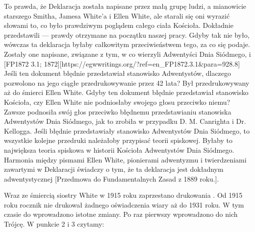 To prawda, że Deklaracja  została napisane przez małą grupę ludzi, a mianowicie starszego Smitha, Jamesa White'a i Ellen White, ale starali się oni wyrazić słowami to, co było prawdziwym poglądem całego ciała Kościoła. Dokładnie przedstawili  — prawdy otrzymane na początku naszej pracy. Gdyby tak nie było, wówczas ta deklaracja byłaby całkowitym przeciwieństwem tego, za co się podaje. Zostały one napisane,  związane z tym, w co wierzyli Adwentyści Dnia Siódmego,  i [FP1872 3.1; 1872][https://egwwritings.org/?ref=en\_FP1872.3.1&para=928.8] Jeśli ten dokument błędnie przedstawiał stanowisko Adwentystów, dlaczego pozwolono na jego ciągłe przedrukowywanie przez 42 lata? Był przedrukowywany aż do śmierci Ellen White. Gdyby ten dokument błędnie przedstawiał stanowisko Kościoła, czy Ellen White nie podniosłaby swojego głosu przeciwko niemu? Zawsze podnosiła swój głos przeciwko błędnemu przedstawianiu stanowiska Adwentystów Dnia Siódmego, jak to zrobiła w przypadku D. M. Canrighta i Dr. Kellogga. Jeśli  błędnie przedstawiały stanowisko Adwentystów Dnia Siódmego, to wszystkie kolejne przedruki należałoby przypisać teorii spiskowej. Byłaby to największa teoria spiskowa w historii Kościoła Adwentystów Dnia Siódmego. Harmonia między pismami Ellen White, pionierami adwentyzmu i twierdzeniami zawartymi w Deklaracji  świadczy o tym, że ta deklaracja jest dokładnym  adwentystycznej [Przedmowa do Fundamentalnych Zasad z 1889 roku.].

Wraz ze śmiercią siostry White w 1915 roku zaprzestano drukowania . Od 1915 roku rocznik nie drukował żadnego oświadczenia wiary aż do 1931 roku. W tym czasie do  wprowadzono istotne zmiany. Po raz pierwszy wprowadzono do nich Trójcę. W punkcie 2 i 3 czytamy:


